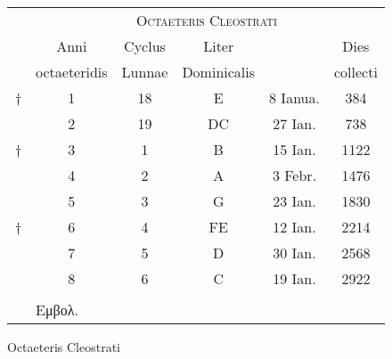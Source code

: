 %
\normalsize
\centering
\renewcommand{\arraystretch}{1.3}
\begin{tabular}[t]{r c c c c c}
~ & \multicolumn{5}{c}{\Large\textsc{Octaeteris Cleostrati}}\\
\cline{2-6}
~ &
\multicolumn{1}{c}{Anni} &
\multicolumn{1}{c}{Cyclus} &
\multicolumn{1}{c}{Liter} &
~ &
\multicolumn{1}{c}{Dies}
\\
~ &
\multicolumn{1}{c}{octaeteridis} &
\multicolumn{1}{c}{Lunnae} &
\multicolumn{1}{c}{Dominicalis} &
~ &
\multicolumn{1}{c}{collecti}
\\
\cline{2-6}
\scriptsize{†}
  &  1 & 18 &  E &  8 Ianua. &  384 \\
~ &  2 & 19 & DC & 27 Ian.   &  738 \\
\scriptsize{†}
  &  3 &  1 &  B & 15 Ian.   & 1122 \\
~ &  4 &  2 &  A &  3 Febr.  & 1476 \\
~ &  5 &  3 &  G & 23 Ian.   & 1830 \\
\scriptsize{†}
  &  6 &  4 & FE & 12 Ian.   & 2214 \\
~ &  7 &  5 &  D & 30 Ian.   & 2568 \\
~ &  8 &  6 &  C & 19 Ian.   & 2922 \\
\cline{2-6}
\\
~ & \multicolumn{5}{l}{\footnotesize \super{†} \textgreek{Εμβολ.}}\\
\end{tabular}
\caption{Octaeteris Cleostrati}
\label{tab:p065}
%